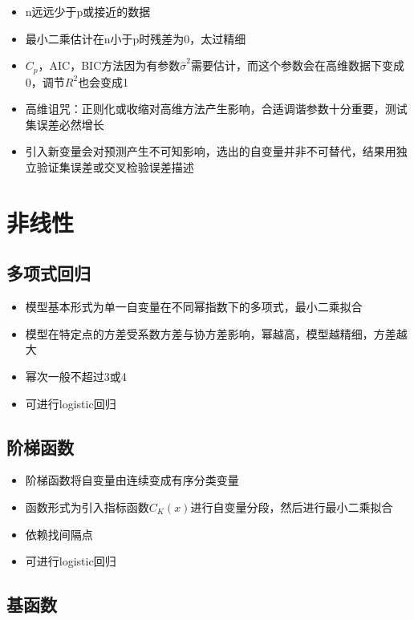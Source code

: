 \documentclass[]{book}
\providecommand{\tightlist}{%
  \setlength{\itemsep}{0pt}\setlength{\parskip}{0pt}}
\begin{document}
\begin{itemize}
\tightlist
\item
  n远远少于p或接近的数据
\item
  最小二乘估计在n小于p时残差为0，太过精细
\item
  \(C_p\)，AIC，BIC方法因为有参数\(\hat \sigma^2\)需要估计，而这个参数会在高维数据下变成0，调节\(R^2\)也会变成1
\item
  高维诅咒：正则化或收缩对高维方法产生影响，合适调谐参数十分重要，测试集误差必然增长
\item
  引入新变量会对预测产生不可知影响，选出的自变量并非不可替代，结果用独立验证集误差或交叉检验误差描述
\end{itemize}

\section{非线性}

\subsection{多项式回归}

\begin{itemize}
\tightlist
\item
  模型基本形式为单一自变量在不同幂指数下的多项式，最小二乘拟合
\item
  模型在特定点的方差受系数方差与协方差影响，幂越高，模型越精细，方差越大
\item
  幂次一般不超过3或4
\item
  可进行logistic回归
\end{itemize}

\subsection{阶梯函数}

\begin{itemize}
\tightlist
\item
  阶梯函数将自变量由连续变成有序分类变量
\item
  函数形式为引入指标函数\(C_K(x)\)进行自变量分段，然后进行最小二乘拟合
\item
  依赖找间隔点
\item
  可进行logistic回归
\end{itemize}

\subsection{基函数}
\end{document}
